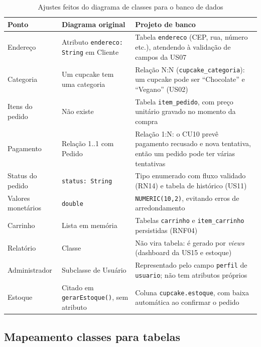 \documentclass[12pt]{article}
\begin{document}
\begin{table}[H]
\centering
\small
\renewcommand{\arraystretch}{1.3}
\begin{tabular}{|p{3.3cm}|p{5.2cm}|p{5.2cm}|}
\hline
\rowcolor{gray!40} \textbf{Ponto} & \textbf{Diagrama original} & \textbf{Projeto de banco} \\ \hline
Endereço & Atributo \texttt{endereco: String} em Cliente & Tabela \texttt{endereco} (CEP, rua, número etc.), atendendo à validação de campos da US07 \\ \hline
Categoria & Um cupcake tem uma categoria & Relação N:N (\texttt{cupcake\_categoria}): um cupcake pode ser ``Chocolate'' e ``Vegano'' (US02) \\ \hline
Itens do pedido & Não existe & Tabela \texttt{item\_pedido}, com preço unitário gravado no momento da compra \\ \hline
Pagamento & Relação 1..1 com Pedido & Relação 1:N: o CU10 prevê pagamento recusado e nova tentativa, então um pedido pode ter várias tentativas \\ \hline
Status do pedido & \texttt{status: String} & Tipo enumerado com fluxo validado (RN14) e tabela de histórico (US11) \\ \hline
Valores monetários & \texttt{double} & \texttt{NUMERIC(10,2)}, evitando erros de arredondamento \\ \hline
Carrinho & Lista em memória & Tabelas \texttt{carrinho} e \texttt{item\_carrinho} persistidas (RNF04) \\ \hline
Relatório & Classe & Não vira tabela: é gerado por \textit{views} (dashboard da US15 e estoque) \\ \hline
Administrador & Subclasse de Usuário & Representado pelo campo \texttt{perfil} de \texttt{usuario}; não tem atributos próprios \\ \hline
Estoque & Citado em \texttt{gerarEstoque()}, sem atributo & Coluna \texttt{cupcake.estoque}, com baixa automática ao confirmar o pedido \\ \hline
\end{tabular}
\caption{Ajustes feitos do diagrama de classes para o banco de dados}
\end{table}

\subsection{Mapeamento classes para tabelas}
\end{document}
